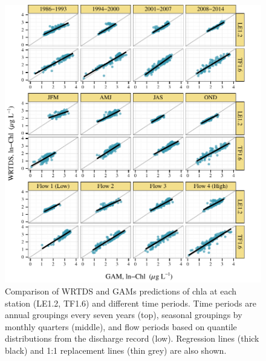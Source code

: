 \documentclass[letterpaper,12pt,oneside]{article}\usepackage[]{graphicx}\usepackage[]{color}
\makeatletter
\def\maxwidth{ %
  \ifdim\Gin@nat@width>\linewidth
    \linewidth
  \else
    \Gin@nat@width
  \fi
}
\makeatother
\begin{document}
\begin{figure}[!ht]

{\centering \includegraphics[width=\maxwidth]{figs/wrtdsvgam-1} 

}

\caption[Comparison of \ac{WRTDS} and \acp{GAM} predictions of \ac{chla} at each station (LE1]{Comparison of \ac{WRTDS} and \acp{GAM} predictions of \ac{chla} at each station (LE1.2, TF1.6) and different time periods.  Time periods are annual groupings every seven years (top), seasonal groupings by monthly quarters (middle), and flow periods based on quantile distributions from the discharge record (low).  Regression lines (thick black) and 1:1 replacement lines (thin grey) are also shown.}\label{fig:wrtdsvgam}
\end{figure}






\end{document}
